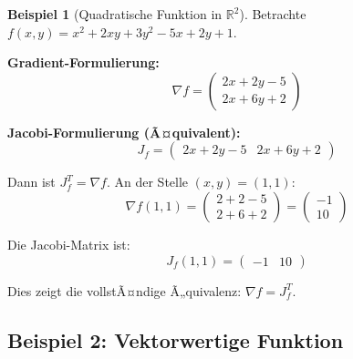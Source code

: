 ﻿\documentclass[a4paper,12pt]{article}
\theoremstyle{definition}
\newtheorem{beispiel}{Beispiel}
\begin{document}
\begin{beispiel}[Quadratische Funktion in $\mathbb{R}^2$]
	Betrachte $f(x, y) = x^2 + 2xy + 3y^2 - 5x + 2y + 1$.
	
	\textbf{Gradient-Formulierung:}
	\[
	\nabla f = \begin{pmatrix} 2x + 2y - 5 \\ 2x + 6y + 2 \end{pmatrix}
	\]
	
	\textbf{Jacobi-Formulierung (Ã¤quivalent):}
	\[
	J_f = \begin{pmatrix} 2x + 2y - 5 & 2x + 6y + 2 \end{pmatrix}
	\]
	
	Dann ist $J_f^T = \nabla f$. An der Stelle $(x, y) = (1, 1)$:
	\[
	\nabla f(1,1) = \begin{pmatrix} 2 + 2 - 5 \\ 2 + 6 + 2 \end{pmatrix} = \begin{pmatrix} -1 \\ 10 \end{pmatrix}
	\]
	
	Die Jacobi-Matrix ist:
	\[
	J_f(1,1) = \begin{pmatrix} -1 & 10 \end{pmatrix}
	\]
	
	Dies zeigt die vollstÃ¤ndige Ã„quivalenz: $\nabla f = J_f^T$.
\end{beispiel}

\subsection{Beispiel 2: Vektorwertige Funktion}
\end{document}
